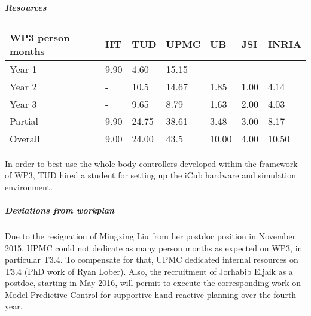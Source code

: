 
\subparagraph*{Resources}

\begin{center}
\begin{tabular}{|C{1.5cm}|C{1.5cm}|C{1.5cm}|C{2cm}|C{2cm}|C{2cm}|C{2cm}|}
\hline
\footnotesize \textbf{WP3 person months} & \footnotesize \textbf{IIT}&\footnotesize \textbf{TUD}&\footnotesize \textbf{UPMC}& \footnotesize \textbf{UB} &\footnotesize \textbf{JSI} &\footnotesize \textbf{INRIA} \\ \hline
\footnotesize Year 1  &  9.90 & 4.60  & 15.15 & -    & -    &  -   \\  \hline
\footnotesize Year 2  &  -    & 10.5  & 14.67 & 1.85 & 1.00 & 4.14  \\  \hline
\footnotesize Year 3  &  -    & 9.65  & 8.79  & 1.63 & 2.00 & 4.03 \\  \hline
\footnotesize Partial &  9.90 & 24.75 & 38.61 & 3.48 & 3.00 & 8.17 \\ 
\hline \hline
\footnotesize Overall &  9.00 & 24.00 & 43.5 & 10.00 & 4.00 & 10.50 \\ \hline
\end{tabular}
\end{center}

In order to best use the whole-body controllers developed within the framework of WP3, TUD hired a student for setting up the iCub hardware and simulation environment.

\subparagraph*{Deviations from workplan}

Due to the resignation of Mingxing Liu from her postdoc position in November 2015, UPMC could not dedicate as many person months as expected on WP3, in particular T3.4. To compensate for that, UPMC dedicated internal resources on T3.4 (PhD work of Ryan Lober). Also, the recruitment of Jorhabib Eljaik as a postdoc, starting in May 2016, will permit to execute the corresponding work on Model Predictive Control for supportive hand reactive planning over the fourth year. 



